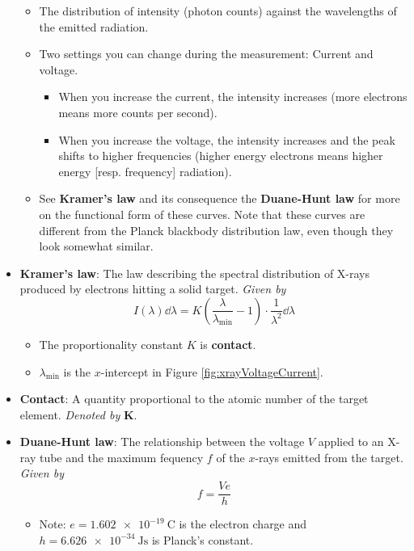 \documentclass[../notes.tex]{subfiles}
\begin{document}
\begin{itemize}
\begin{itemize}
        \item The distribution of intensity (photon counts) against the wavelengths of the emitted radiation.
        \item Two settings you can change during the measurement: Current and voltage.
        \begin{itemize}
            \item When you increase the current, the intensity increases (more electrons means more counts per second).
            \item When you increase the voltage, the intensity increases and the peak shifts to higher frequencies (higher energy electrons means higher energy [resp. frequency] radiation).
        \end{itemize}
        \item See \textbf{Kramer's law} and its consequence the \textbf{Duane-Hunt law} for more on the functional form of these curves. Note that these curves are different from the Planck blackbody distribution law, even though they look somewhat similar.
    \end{itemize}
    \item \textbf{Kramer's law}: The law describing the spectral distribution of X-rays produced by electrons hitting a solid target. \emph{Given by}
    \begin{equation*}
        I(\lambda)\dd\lambda = K\left( \frac{\lambda}{\lambda_\text{min}}-1 \right)\cdot\frac{1}{\lambda^2}\dd\lambda
    \end{equation*}
    \begin{itemize}
        \item The proportionality constant $K$ is \textbf{contact}.
        \item $\lambda_\text{min}$ is the $x$-intercept in Figure \ref{fig:xrayVoltageCurrent}.
    \end{itemize}
    \item \textbf{Contact}: A quantity proportional to the atomic number of the target element. \emph{Denoted by} $\bm{K}$.
    \item \textbf{Duane-Hunt law}: The relationship between the voltage $V$ applied to an X-ray tube and the maximum fequency $f$ of the $x$-rays emitted from the target. \emph{Given by}
    \begin{equation*}
        f = \frac{Ve}{h}
    \end{equation*}
    \begin{itemize}
        \item Note: $e=\SI{1.602e-19}{\coulomb}$ is the electron charge and $h=\SI{6.626e-34}{\joule\second}$ is Planck's constant.

\end{itemize}
\end{itemize}
\end{document}
